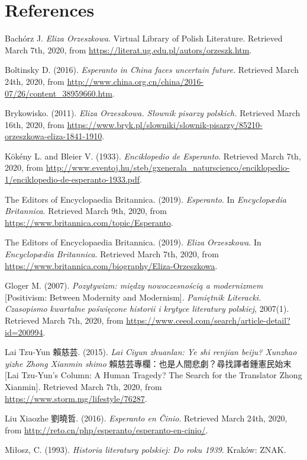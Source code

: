 \chapter*{References}

Bachórz J. \textit{Eliza Orzeszkowa}. Virtual Library of Polish Literature. Retrieved March 7th, 2020, from \url{https://literat.ug.edu.pl/autors/orzeszk.htm}.

Boltinsky D. (2016). \textit{Esperanto in China faces uncertain future.} Retrieved March 24th, 2020, from \url{http://www.china.org.cn/china/2016-07/26/content_38959660.htm}.

Brykowisko. (2011). \textit{Eliza Orzeszkowa. Słownik pisarzy polskich.} Retrieved March 16th, 2020, from \url{https://www.bryk.pl/slowniki/slownik-pisarzy/85210-orzeszkowa-eliza-1841-1910}.

Kökény L. and Bleier V. (1933). \textit{Enciklopedio de Esperanto}. Retrieved March 7th, 2020, from \url{http://www.eventoj.hu/steb/gxenerala_naturscienco/enciklopedio-1/enciklopedio-de-esperanto-1933.pdf}.

The Editors of Encyclopaedia Britannica. (2019). \textit{Esperanto}. In \textit{Encyclopædia Britannica}. Retrieved March 9th, 2020, from \url{https://www.britannica.com/topic/Esperanto}.

The Editors of Encyclopaedia Britannica. (2019). \textit{Eliza Orzeszkowa}. In \textit{Encyclopædia Britannica}. Retrieved March 7th, 2020, from \url{https://www.britannica.com/biography/Eliza-Orzeszkowa}.

Gloger M. (2007). \textit{Pozytywizm: między nowoczesnością a modernizmem} [Positivism: Between Modernity and Modernism]. \textit{Pamiętnik Literacki. Czasopismo kwartalne poświęcone historii i krytyce literatury polskiej}, 2007(1). Retrieved March 7th, 2020, from \url{https://www.ceeol.com/search/article-detail?id=200994}.

Lai Tzu-Yun 賴慈芸. (2015). \textit{Lai Ciyun zhuanlan: Ye shi renjian beiju? Xunzhao yizhe Zhong Xianmin shimo} 賴慈芸專欄：也是人間悲劇？尋找譯者鍾憲民始末 [Lai Tzu-Yun's Column: A Human Tragedy? The Search for the Translator Zhong Xianmin]. Retrieved March 7th, 2020, from \url{https://www.storm.mg/lifestyle/76287}.

Liu Xiaozhe 劉曉哲. (2016). \textit{Esperanto en Ĉinio}. Retrieved March 24th, 2020, from \url{http://reto.cn/php/esperanto/esperanto-en-cinio/}.

Miłosz, C. (1993). \textit{Historia literatury polskiej: Do roku 1939}. Kraków: ZNAK. 

